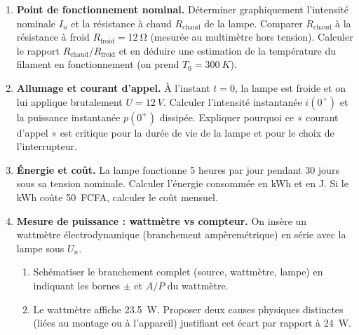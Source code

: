 \documentclass[11pt]{article}
\begin{document}
\begin{exercice}
\begin{enumerate}
\item \textbf{Point de fonctionnement nominal.} 
Déterminer graphiquement l'intensité nominale $I_n$ et la résistance à chaud $R_{\text{chaud}}$ de la lampe. Comparer $R_{\text{chaud}}$ à la résistance à froid $R_{\text{froid}} = \SI{12}{\ohm}$ (mesurée au multimètre hors tension). Calculer le rapport $R_{\text{chaud}}/R_{\text{froid}}$ et en déduire une estimation de la température du filament en fonctionnement (on prend $T_0 = \SI{300}{K}$).
\item \textbf{Allumage et courant d'appel.} 
À l'instant $t=0$, la lampe est froide et on lui applique brutalement $U = \SI{12}{V}$. Calculer l'intensité instantanée $i(0^+)$ et la puissance instantanée $p(0^+)$ dissipée. Expliquer pourquoi ce « courant d'appel » est critique pour la durée de vie de la lampe et pour le choix de l'interrupteur.
\item \textbf{Énergie et coût.} 
La lampe fonctionne 5 heures par jour pendant 30 jours sous sa tension nominale. Calculer l'énergie consommée en kWh et en J. Si le kWh coûte \SI{50}{FCFA}, calculer le coût mensuel.
\item \textbf{Mesure de puissance : wattmètre vs compteur.} 
On insère un wattmètre électrodynamique (branchement ampèremétrique) en série avec la lampe sous $U_n$. 
\begin{enumerate}[label=\alph*)]
\item Schématiser le branchement complet (source, wattmètre, lampe) en indiquant les bornes $\pm$ et $A/P$ du wattmètre.
\item Le wattmètre affiche \SI{23,5}{W}. Proposer deux causes physiques distinctes (liées au montage ou à l'appareil) justifiant cet écart par rapport à \SI{24}{W}.
\end{enumerate}
\end{enumerate}
\end{exercice}
\end{document}
